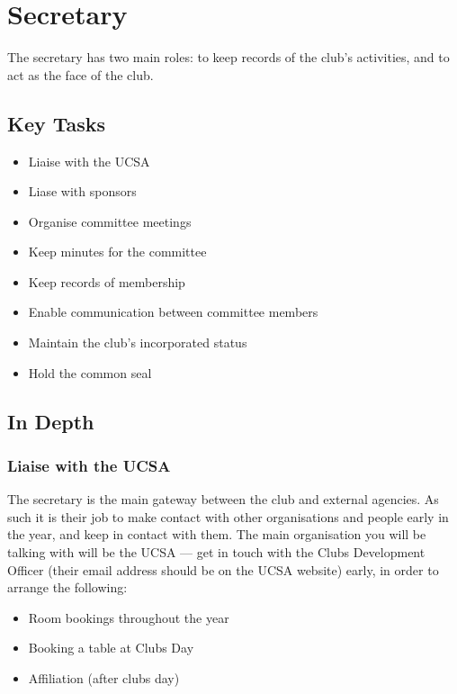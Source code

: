\section{Secretary}
\label{sec:secretary}

The secretary has two main roles: to keep records of the club's activities, and to act as the face of the club.

\subsection{Key Tasks}
\label{sub:secretary_key_tasks}

\begin{itemize}
  \item Liaise with the UCSA
  \item Liase with sponsors
  \item Organise committee meetings
  \item Keep minutes for the committee
  \item Keep records of membership
  \item Enable communication between committee members
  \item Maintain the club's incorporated status
  \item Hold the common seal
\end{itemize}

\subsection{In Depth}

\subsubsection{Liaise with the UCSA}

The secretary is the main gateway between the club and external agencies. As such it is their job to make contact with other organisations and people early in the year, and keep in contact with them. The main organisation you will be talking with will be the UCSA --- get in touch with the Clubs Development Officer (their email address should be on the UCSA website) early, in order to arrange the following:

\begin{itemize}
  \item Room bookings throughout the year
  \item Booking a table at Clubs Day
  \item Affiliation (after clubs day)
\end{itemize}

